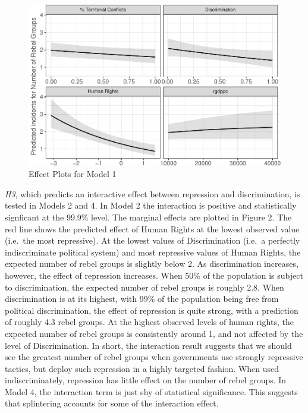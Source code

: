 \documentclass[12pt,]{book}
\begin{document}
\begin{figure}
\centering
\includegraphics{_main_files/figure-latex/effectplot-1.pdf}
\caption{\label{fig:effectplot}Effect Plots for Model 1}
\end{figure}

\emph{H3}, which predicts an interactive effect between repression and
discrimination, is tested in Models 2 and 4. In Model 2 the interaction
is positive and statistically signficant at the 99.9\% level. The
marginal effects are plotted in Figure 2. The red line shows the
predicted effect of Human Rights at the lowest observed value (i.e.~the
most repressive). At the lowest values of Discrimination (i.e.~a
perfectly indiscriminate political system) and most repressive values of
Human Rights, the expected number of rebel groups is slightly below 2.
As discrimination increases, however, the effect of repression
increases. When 50\% of the population is subject to discrimination, the
expected number of rebel groups is roughly 2.8. When discrimination is
at its highest, with 99\% of the population being free from political
discrimination, the effect of repression is quite strong, with a
prediction of roughly 4.3 rebel groups. At the highest observed levels
of human rights, the expected number of rebel groups is consistently
around 1, and not affected by the level of Discrimination. In short, the
interaction result suggests that we should see the greatest number of
rebel groups when governments use strongly repressive tactics, but
deploy such repression in a highly targeted fashion. When used
indiscriminately, repression has little effect on the number of rebel
groups. In Model 4, the interaction term is just shy of statistical
significance. This suggests that splintering accounts for some of the
interaction effect.
\end{document}
